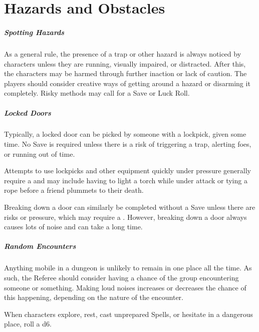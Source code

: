 \documentclass[itdr]{subfiles}
\begin{document}
\chapter{Hazards and Obstacles}
\label{ch:hazards_and_obstacles}

\paragraph{Spotting Hazards}
As a general rule, the presence of a trap or other hazard is always noticed by characters unless they are running, visually impaired, or distracted. After this, the characters may be harmed through further inaction or lack of caution. The players should consider creative ways of getting around a hazard or disarming it completely. Risky methods may call for a Save or Luck Roll.

\vfill
\paragraph{Locked Doors}
Typically, a locked door can be picked by someone with a lockpick, given some time. No Save is required unless there is a risk of triggering a trap, alerting foes, or running out of time.

Attempts to use lockpicks and other equipment quickly under pressure generally require a  and may include having to light a torch while under attack or tying a rope before a friend plummets to their death.

Breaking down a door can similarly be completed without a Save unless there are risks or pressure, which may require a . However, breaking down a door always causes lots of noise and can take a long time.

\vfill
\paragraph{Random Encounters}
Anything mobile in a dungeon is unlikely to remain in one place all the time. As such, the Referee should consider having a chance of the group encountering someone or something. Making loud noises increases or decreases the chance of this happening, depending on the nature of the encounter.

When characters explore, rest, cast unprepared Spells, or hesitate in a dangerous place, roll a d6.
\end{document}

